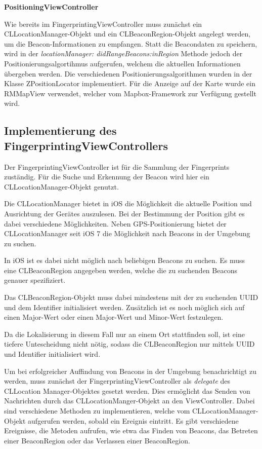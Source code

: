 \textbf{PositioningViewController}

Wie bereits im FingerprintingViewController muss zunächst ein CLLocationManager-Objekt und ein CLBeaconRegion-Objekt angelegt werden, um die Beacon-Informationen zu empfangen.
Statt die Beacondaten zu speichern, wird in der \emph{locationManager:
\newline didRangeBeacons:inRegion} Methode jedoch der Positionierungsalgortihmus aufgerufen, welchem die aktuellen Informationen übergeben werden. 
Die verschiedenen Positionierungsalgorithmen wurden in der Klasse ZPositionLocator implementiert.
Für die Anzeige auf der Karte wurde ein RMMapView verwendet, welcher vom Mapbox-Framework zur Verfügung gestellt wird.


\subsection{Implementierung des FingerprintingViewControllers}
\label{sec:}

Der FingerprintingViewController ist für die Sammlung der Fingerprints zuständig. 
Für die Suche und Erkennung der Beacon wird hier ein CLLocationManager-Objekt genutzt.

Die CLLocationManager bietet in iOS die Möglichkeit die aktuelle Position und Ausrichtung der Gerätes auszulesen. 
Bei der Bestimmung der Position gibt es dabei verschiedene Möglichkeiten. Neben GPS-Positionierung bietet der CLLocationManager seit iOS 7 die Möglichkeit nach Beacons in der Umgebung zu suchen.

In iOS ist es dabei nicht möglich nach beliebigen Beacons zu suchen. Es muss eine CLBeaconRegion angegeben werden, welche die zu suchenden Beacons genauer spezifiziert. 

Das CLBeaconRegion-Objekt muss dabei mindestens mit der zu suchenden UUID und dem Identifier initialisiert werden. Zusätzlich ist es noch möglich sich auf einen Major-Wert oder einen Major-Wert und Minor-Wert festzulegen. 

Da die Lokalisierung in diesem Fall nur an einem Ort stattfinden soll, ist eine tiefere Untescheidung nicht nötig, sodass die CLBeaconRegion nur mittels UUID und Identifier initialisiert wird. 

Um bei erfolgreicher Auffindung von Beacons in der Umgebung benachrichtigt zu werden, muss zunächst der FingerprintingViewController als \emph{delegate} des CLLocation \newline Manager-Objektes gesetzt werden. 
Dies ermöglicht das Senden von Nachrichten durch das CLLocationManger-Objekt an den ViewController. Dabei sind verschiedene Methoden zu implementieren, welche vom CLLocationManager-Objekt aufgerufen werden, sobald ein Ereignis eintritt. Es gibt verschiedene Ereignisse, die Metoden aufrufen, wie etwa das Finden von Beacons, das Betreten einer BeaconRegion oder das Verlassen einer BeaconRegion. 

